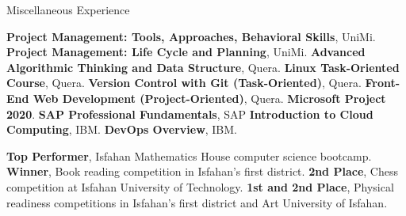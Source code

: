 \begin{rubric}{Miscellaneous Experience}


\entry*[Mar 2023] \textbf{Project Management: Tools, Approaches, Behavioral Skills}, UniMi.  
\entry*[Jan 2023] \textbf{Project Management: Life Cycle and Planning}, UniMi.  
\entry*[May 2025] \textbf{Advanced Algorithmic Thinking and Data Structure}, Quera.
\entry*[Feb 2023] \textbf{Linux Task-Oriented Course}, Quera.  
\entry*[Dec 2022] \textbf{Version Control with Git (Task-Oriented)}, Quera.
\entry*[Feb 2024] \textbf{Front-End Web Development (Project-Oriented)}, Quera.  
\entry*[Dec 2023] \textbf{Microsoft Project 2020}.  
\entry*[Nov 2023] \textbf{SAP Professional Fundamentals}, SAP
\entry*[Jan 2024] \textbf{Introduction to Cloud Computing}, IBM.
\entry*[Jul 2023] \textbf{DevOps Overview}, IBM.  


\entry*[2016] \textbf{Top Performer}, Isfahan Mathematics House computer science bootcamp.  
\entry*[2014] \textbf{Winner}, Book reading competition in Isfahan's first district. 
\entry*[2021] \textbf{2nd Place}, Chess competition at Isfahan University of Technology.  
\entry*[2012 - 2014] \textbf{1st and 2nd Place}, Physical readiness competitions in Isfahan’s first district and Art University of Isfahan.

\end{rubric}
